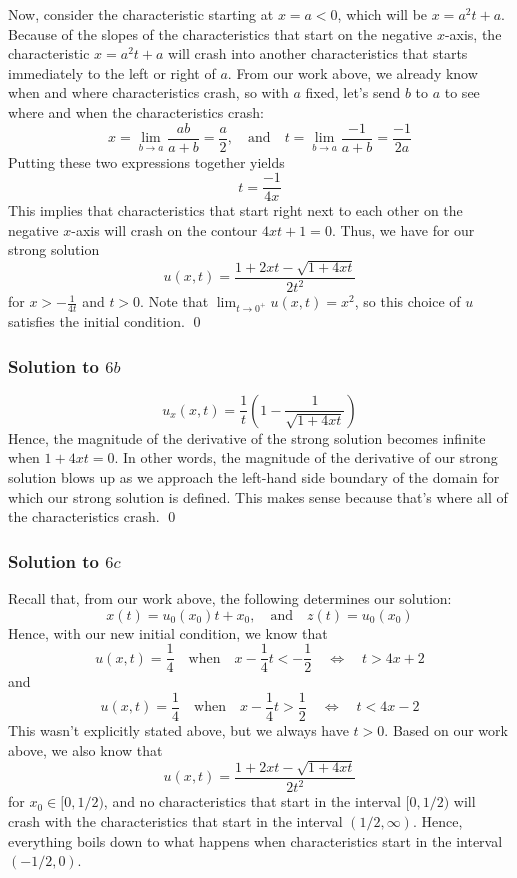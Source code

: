 \vspace{0.4cm}

Now, consider the characteristic starting at $x=a < 0$, which will be $x = a^2 t + a$. Because of the slopes of the characteristics that start on the negative $x$-axis, the characteristic $x = a^2t + a$ will crash into another characteristics that starts immediately to the left or right of $a$. From our work above, we already know when and where characteristics crash, so with $a$ fixed, let's send $b$ to $a$ to see where and when the characteristics crash:
$$ x = \lim_{b \to a} \frac{ab}{a+b} = \frac{a}{2}, \quad \text{and} \quad t = \lim_{b \to a} \frac{-1}{a+b} = \frac{-1}{2a} $$
Putting these two expressions together yields
$$t = \frac{-1}{4x} $$
This implies that characteristics that start right next to each other on the negative $x$-axis will crash on the contour $4xt + 1 = 0$. Thus, we have for our strong solution
$$ u(x,t) = \frac{1 + 2xt - \sqrt{1+4xt}}{2t^2} $$
for $x  > -\frac{1}{4t}$ and $t > 0$. Note that $\lim_{t \to 0^+} u(x,t) = x^2$, so this choice of $u$ satisfies the initial condition. \qed


\subsubsection*{Solution to $6b$}
$$ u_x(x,t) = \frac{1}{t} \left( 1 - \frac{1}{\sqrt{1+4xt}} \right) $$
Hence, the magnitude of the derivative of the strong solution becomes infinite when $1+4xt = 0$. In other words, the magnitude of the derivative of our strong solution blows up as we approach the left-hand side boundary of the domain for which our strong solution is defined. This makes sense because that's where all of the characteristics crash. \qed



\subsubsection*{Solution to $6c$}

Recall that, from our work above, the following determines our solution:
$$ x(t) = u_0(x_0) t + x_0, \quad \text{and} \quad z(t) = u_0(x_0) $$
Hence, with our new initial condition, we know that
$$ u(x,t) = \frac{1}{4} \quad \text{when} \quad x - \frac{1}{4} t < -\frac{1}{2} \quad \Leftrightarrow \quad t > 4x+2$$
and
$$ u(x,t) = \frac{1}{4} \quad \text{when} \quad x - \frac{1}{4} t > \frac{1}{2} \quad \Leftrightarrow \quad t < 4x-2$$
This wasn't explicitly stated above, but we always have $t > 0$. Based on our work above, we also know that
$$ u(x,t) = \frac{1 + 2xt - \sqrt{1+4xt}}{2t^2} $$
for $x_0 \in [0,1/2)$, and no characteristics that start in the interval $[0,1/2)$ will crash with the characteristics that start in the interval $(1/2, \infty)$. Hence, everything boils down to what happens when characteristics start in the interval $(-1/2,0)$.

